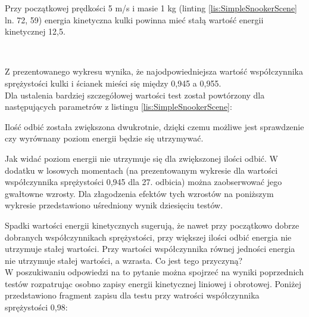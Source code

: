 

Przy początkowej prędkości 5 m/s i masie 1 kg (linting
\ref{lis:SimpleSnookerScene} ln. 72, 59) energia kinetyczna kulki powinna mieć
stałą wartość energii kinetycznej 12,5.
\begin{center}
\\
\end{center}
Z prezentowanego wykresu wynika, że najodpowiedniejsza wartość współczynnika
sprężystości kulki i ścianek mieści się między 0,945 a 0,955.\\
Dla ustalenia bardziej szczegółowej wartości test został powtórzony dla
następujących parametrów z listingu \ref{lis:SimpleSnookerScene}:


  
Ilość odbić została zwiększona dwukrotnie, dzięki czemu możliwe jest sprawdzenie
czy wyrównany poziom energii będzie się utrzymywać.
  


Jak widać poziom energii nie utrzymuje się dla zwiększonej ilości odbić. W
dodatku w losowych momentach (na prezentowanym wykresie dla wartości
współczynnika sprężystości 0,945 dla 27. odbicia) można zaobserwować jego
gwałtowne wzrosty. Dla złagodzenia efektów tych wzrostów na poniższym wykresie
przedstawiono uśredniony wynik dziesięciu testów.



Spadki wartości energii kinetycznych sugerują, że nawet przy początkowo dobrze
dobranych współczynnikach sprężystości, przy większej ilości odbić energia nie
utrzymuje stałej wartości. Przy wartości współczynnika równej jedności energia
nie utrzymuje stałej wartości, a wzrasta. Co jest tego przyczyną? \\
W poszukiwaniu odpowiedzi na to pytanie można spojrzeć na wyniki poprzednich
testów rozpatrując osobno zapisy energii kinetycznej liniowej i obrotowej.
Poniżej przedstawiono fragment zapisu dla testu przy watrości współczynnika
sprężystości 0,98:


  
